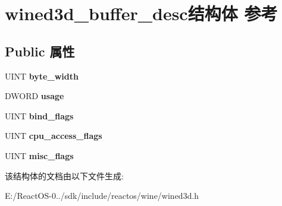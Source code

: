 \hypertarget{structwined3d__buffer__desc}{}\section{wined3d\+\_\+buffer\+\_\+desc结构体 参考}
\label{structwined3d__buffer__desc}
\subsection*{Public 属性}
\begin{DoxyCompactItemize}
\item 
\mbox{\label{structwined3d__buffer__desc_af72fbb0f63514020947b2d74b6a93c59}} 
U\+I\+NT {\bfseries byte\+\_\+width}
\item 
\mbox{\label{structwined3d__buffer__desc_af0078850bb65fc9244bc32de683055ef}} 
D\+W\+O\+RD {\bfseries usage}
\item 
\mbox{\label{structwined3d__buffer__desc_a8c43ffa73f06579ee7bd2a62ac99a8b3}} 
U\+I\+NT {\bfseries bind\+\_\+flags}
\item 
\mbox{\label{structwined3d__buffer__desc_a1492df5686740c671387852a96955957}} 
U\+I\+NT {\bfseries cpu\+\_\+access\+\_\+flags}
\item 
\mbox{\label{structwined3d__buffer__desc_a38fec4edacfd7ff26fbc79ae4e0efd7b}} 
U\+I\+NT {\bfseries misc\+\_\+flags}
\end{DoxyCompactItemize}


该结构体的文档由以下文件生成\+:\begin{DoxyCompactItemize}
\item 
E\+:/\+React\+O\+S-\/0../sdk/include/reactos/wine/wined3d.\+h\end{DoxyCompactItemize}
